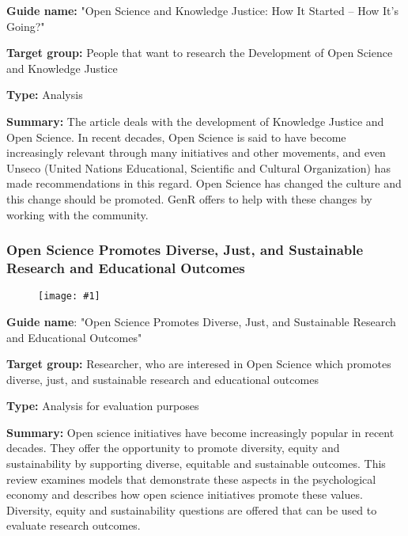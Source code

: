 \documentclass{article}
\newlength{\imgwidth}
\newcommand\scaledgraphics[2]{%
                
\settowidth{\imgwidth}{\texttt{[image: \#1]}}%
                
\setlength{\imgwidth}{\minof{\imgwidth}{#2\textwidth}}%
                
\texttt{[image: \#1]}%
                
}
\begin{document}
\textbf{Guide name:} "Open Science and Knowledge Justice: How It Started – How It’s Going?" \autocite{noauthor_open_2021}


\textbf{Target group: }People that want to research the Development of Open Science and Knowledge Justice


\textbf{Type:} Analysis


\textbf{Summary:} The article deals with the development of Knowledge Justice and Open Science. In recent decades, Open Science is said to have become increasingly relevant through many initiatives and other movements, and even Unseco (United Nations Educational, Scientific and Cultural Organization) has made recommendations in this regard. Open Science has changed the culture and this change should be promoted. GenR offers to help with these changes by working with the community.


\subsubsection{Open Science Promotes Diverse, Just, and Sustainable Research and Educational Outcomes}\label{H4807510}


\begin{figure}
\scaledgraphics{23f9ee73-dda2-4a56-8083-4a618f9983b9.png}{1}
\label{F46402811}
\end{figure}





\textbf{Guide name}: "Open Science Promotes Diverse, Just, and Sustainable Research and Educational Outcomes" \autocite{grahe_open_2019}


\textbf{Target group: }Researcher, who are interesed in Open Science which promotes diverse, just, and sustainable research and educational outcomes


\textbf{Type: }Analysis for evaluation purposes


\textbf{Summary:} Open science initiatives have become increasingly popular in recent decades. They offer the opportunity to promote diversity, equity and sustainability by supporting diverse, equitable and sustainable outcomes. This review examines models that demonstrate these aspects in the psychological economy and describes how open science initiatives promote these values. Diversity, equity and sustainability questions are offered that can be used to evaluate research outcomes.


\printbibliography[title={Bibliography}]
\end{document}
